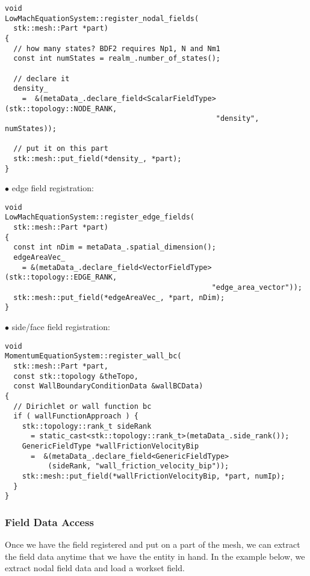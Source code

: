 \begin{lstlisting}
void
LowMachEquationSystem::register_nodal_fields(
  stk::mesh::Part *part)
{
  // how many states? BDF2 requires Np1, N and Nm1
  const int numStates = realm_.number_of_states();

  // declare it
  density_ 
    =  &(metaData_.declare_field<ScalarFieldType>(stk::topology::NODE_RANK, 
                                                 "density", numStates));

  // put it on this part
  stk::mesh::put_field(*density_, *part);
}
\end{lstlisting}

\begin{description}
\item[$\bullet$ edge field registration:]
\end{description}

\begin{lstlisting}
void
LowMachEquationSystem::register_edge_fields(
  stk::mesh::Part *part)
{
  const int nDim = metaData_.spatial_dimension();
  edgeAreaVec_ 
    = &(metaData_.declare_field<VectorFieldType>(stk::topology::EDGE_RANK, 
                                                "edge_area_vector"));
  stk::mesh::put_field(*edgeAreaVec_, *part, nDim);
}
\end{lstlisting}

\begin{description}
\item[$\bullet$ side/face field registration:]
\end{description}

\begin{lstlisting}
void
MomentumEquationSystem::register_wall_bc(
  stk::mesh::Part *part,
  const stk::topology &theTopo,
  const WallBoundaryConditionData &wallBCData)
{
  // Dirichlet or wall function bc
  if ( wallFunctionApproach ) {
    stk::topology::rank_t sideRank 
      = static_cast<stk::topology::rank_t>(metaData_.side_rank());
    GenericFieldType *wallFrictionVelocityBip 
      =  &(metaData_.declare_field<GenericFieldType>
          (sideRank, "wall_friction_velocity_bip"));
    stk::mesh::put_field(*wallFrictionVelocityBip, *part, numIp);
  }
}
\end{lstlisting}

\subsubsection{Field Data Access}
Once we have the field registered and put on a part of the mesh, we can extract the field
data anytime that we have the entity in hand. In the example below, we extract nodal field
data and load a workset field.


